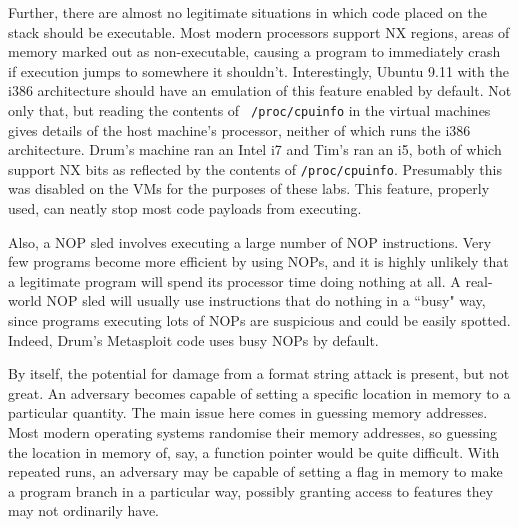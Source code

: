 Further, there are almost no legitimate situations in which code placed on the stack should be executable. Most modern
processors support NX regions, areas of memory marked out as non-executable, causing a program to immediately crash if
execution jumps to somewhere it shouldn't. Interestingly, Ubuntu 9.11 with the i386 architecture should have an
emulation of this feature enabled by default\cite{nx_bit}. Not only that, but reading the contents of {\tt
/proc/cpuinfo} in the virtual machines gives details of the host machine's processor, neither of which runs the i386
architecture. Drum's machine ran an Intel i7 and Tim's ran an i5, both of which support NX bits as reflected by the
contents of {\tt /proc/cpuinfo}. Presumably this was disabled on the VMs for the purposes of these labs. This feature,
properly used, can neatly stop most code payloads from executing.

Also, a NOP sled involves executing a large number of NOP instructions. Very few programs become more efficient by using
NOPs\cite{zip_quine}, and it is highly unlikely that a legitimate program will spend its processor time doing nothing at
all. A real-world NOP sled will usually use instructions that do nothing in a ``busy" way\cite{wiki_sled}, since
programs executing lots of NOPs are suspicious and could be easily spotted. Indeed, Drum's Metasploit code uses busy
NOPs by default.

By itself, the potential for damage from a format string attack is present, but not great. An adversary becomes capable
of setting a specific location in memory to a particular quantity. The main issue here comes in guessing memory
addresses. Most modern operating systems randomise their memory addresses, so guessing the location in memory of, say, a
function pointer would be quite difficult. With repeated runs, an adversary may be capable of setting a flag in memory
to make a program branch in a particular way, possibly granting access to features they may not ordinarily have.

